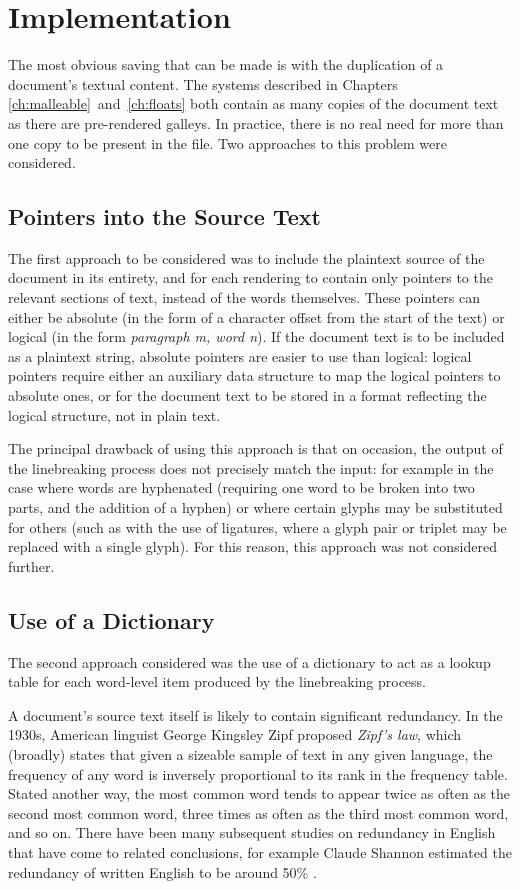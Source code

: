 \newpage
\section{Implementation}
The most obvious saving that can be made is with the duplication of a document's textual content. The systems described in Chapters \ref{ch:malleable}~and~\ref{ch:floats} both contain as many copies of the document text as there are pre-rendered galleys. In practice, there is no real need for more than one copy to be present in the file. Two approaches to this problem were considered.

\subsection{Pointers into the Source Text}
The first approach to be considered was to include the plaintext source of the document in its entirety, and for each rendering to contain only pointers to the relevant sections of text, instead of the words themselves. These pointers can either be absolute (in the form of a character offset from the start of the text) or logical (in the form \emph{paragraph m, word n}). If the document text is to be included as a plaintext string, absolute pointers are easier to use than logical: logical pointers require either an auxiliary data structure to map the logical pointers to absolute ones, or for the document text to be stored in a format reflecting the logical structure, \ie{} not in plain text.

The principal drawback of using this approach is that on occasion, the output of the linebreaking process does not precisely match the input: for example in the case where words are hyphenated (requiring one word to be broken into two parts, and the addition of a hyphen) or where certain glyphs may be substituted for others (such as with the use of ligatures, where a glyph pair or triplet may be replaced with a single glyph). For this reason, this approach was not considered further.


\subsection{Use of a Dictionary}
\label{sec:dictionary}
The second approach considered was the use of a dictionary to act as a lookup table for each word-level item produced by the linebreaking process.

A document's source text itself is likely to contain significant redundancy. In the 1930s, American linguist George Kingsley Zipf proposed \emph{Zipf's law},\hspace{0pt}\cite{zipf1932} which (broadly) states that given a sizeable sample of text in any given language, the frequency of any word is inversely proportional to its rank in the frequency table. Stated another way, the most common word tends to appear twice as often as the second most common word, three times as often as the third most common word, and so on. There have been many subsequent studies on redundancy in English that have come to related conclusions, for example Claude Shannon estimated the redundancy of written English to be around 50\% \cite{Shannon1951, Hirst1988}.

